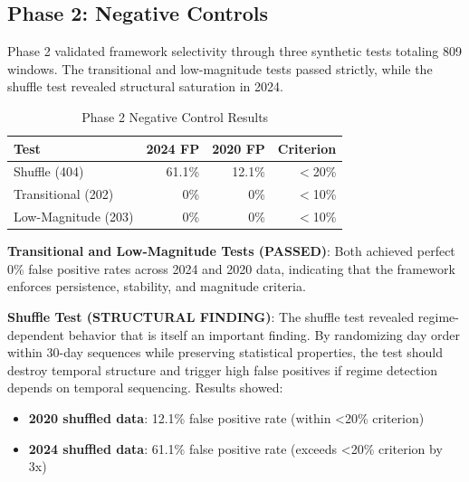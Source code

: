 \subsection{Phase 2: Negative Controls}

\vspace{0.2cm}

Phase 2 validated framework selectivity through three synthetic tests totaling 809 windows. The transitional and low-magnitude tests passed strictly, while the shuffle test revealed structural saturation in 2024.

\begin{table}[ht]
\centering
\caption{Phase 2 Negative Control Results}
\begin{tabular}{@{}lrrr@{}}
\toprule
\textbf{Test} & \textbf{2024 FP} & \textbf{2020 FP} & \textbf{Criterion} \\
\midrule
Shuffle (404) & 61.1\% & 12.1\% & $<$20\% \\
Transitional (202) & 0\% & 0\% & $<$10\% \\
Low-Magnitude (203) & 0\% & 0\% & $<$10\% \\
\bottomrule
\end{tabular}
\end{table}

\vspace{0.2cm}

\noindent\textbf{Transitional and Low-Magnitude Tests (PASSED)}: Both achieved perfect 0\% false positive rates across 2024 and 2020 data, indicating that the framework enforces persistence, stability, and magnitude criteria.

\vspace{0.2cm}

\noindent\textbf{Shuffle Test (STRUCTURAL FINDING)}: The shuffle test revealed regime-dependent behavior that is itself an important finding. By randomizing day order within 30-day sequences while preserving statistical properties, the test should destroy temporal structure and trigger high false positives if regime detection depends on temporal sequencing. Results showed:

\begin{itemize}
\item \textbf{2020 shuffled data}: 12.1\% false positive rate (within <20\% criterion)
\item \textbf{2024 shuffled data}: 61.1\% false positive rate (exceeds <20\% criterion by 3x)
\end{itemize}

